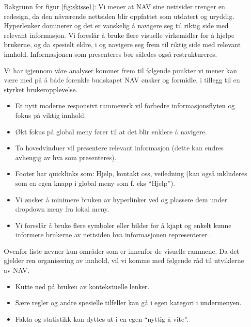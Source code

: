\documentclass[informationsecurity]{gucmasterproject}
\begin{document}
Bakgrunn for figur \ref{fig:skisse1}:
Vi mener at NAV sine nettsider trenger en redesign, da den nåværende nettsiden blir oppfattet som utdatert og uryddig. Hyperlenker dominerer og det er vanskelig å navigere seg til riktig side med relevant informasjon. Vi foreslår å bruke flere visuelle virkemidler for å hjelpe brukerne, og da spesielt eldre, i og navigere seg frem til riktig side med relevant innhold. Informasjonen som presenteres bør således også restruktureres.

Vi har igjennom våre analyser kommet frem til følgende punkter vi mener kan være med på å både forenkle budskapet NAV ønsker og formidle, i tillegg til en styrket brukeropplevelse.

\begin{itemize}
\item Et nytt moderne responsivt rammeverk vil forbedre informasjonsflyten og fokus på viktig innhold.
\item Økt fokus på global meny fører til at det blir enklere å navigere.
\item To hovedvinduer vil presentere relevant informasjon (dette kan endres avhengig av hva som presenteres).
\item Footer har quicklinks som: Hjelp, kontakt oss, veiledning (kan også inkluderes som en egen knapp i global meny som f. eks “Hjelp”).
\item Vi ønsker å minimere bruken av hyperlinker ved og plassere dem under dropdown meny fra lokal meny.
\item Vi foreslår å bruke flere symboler eller bilder for å kjapt og enkelt kunne informere brukerne av nettsiden hva informasjonen representerer.
\end{itemize}
Ovenfor liste nevner kun områder som er innenfor de visuelle rammene. Da det gjelder ren organisering av innhold, vil vi komme med følgende råd til utviklerne av NAV.
\begin{itemize}
\item Kutte ned på bruken av kontekstuelle lenker.
\item Sære regler og andre spesielle tilfeller kan gå i egen kategori i undermenyen.
\item Fakta og statistikk kan dyttes ut i en egen “nyttig å vite”.
\end{itemize}
\end{document}
